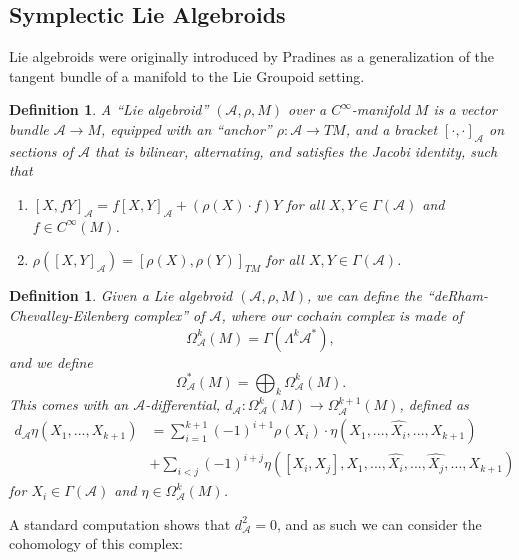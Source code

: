\documentclass{amsart}
\newcommand{\ra}{\rightarrow}
\newtheorem{definition}[theorem]{Definition}
\newcommand{\A}{\mathcal{A}}
\theoremstyle{definition}
\begin{document}
\subsection{Symplectic Lie Algebroids}
Lie algebroids were originally introduced by Pradines \cite{zbMATH03247872} as a generalization of the tangent bundle of a manifold to the Lie Groupoid setting.
\begin{definition}
     A ``Lie algebroid'' $(\A, \rho, M)$ over a $C^\infty$-manifold $M$ is a vector bundle $\A \ra M$, equipped with an ``anchor'' $\rho:\A \ra TM$, and a bracket $[\cdot,\cdot]_\A$ on sections of $\A$ that is bilinear, alternating, and satisfies the Jacobi identity, such that
    \begin{enumerate}
        \item $[X,fY]_\A=f[X,Y]_\A + (\rho(X) \cdot f) Y$ for all $X,Y \in \Gamma(\A)$ and $f \in C^\infty(M)$.
        \item $\rho([X,Y]_\A) = [\rho(X),\rho(Y)]_{TM}$ for all $X,Y \in \Gamma(\A)$.
    \end{enumerate}
\end{definition}
\begin{definition}\label{DCEcomplex} Given a Lie algebroid $(\A, \rho,M)$, we can define the ``deRham-Chevalley-Eilenberg complex'' of $\A$, where our cochain complex is made of
\begin{equation*}
    \Omega^k_\A(M) = \Gamma(\Lambda^k\A^*),
\end{equation*}
and we define 
\begin{equation*}
    \Omega^*_\A(M) = \bigoplus_k \Omega^k_\A(M).
\end{equation*}
This comes with an $\A$-differential, $d_\A:\Omega^k_\A(M) \ra \Omega^{k+1}_\A(M)$, defined as
\begin{align*}
    d_\A \eta(X_1,...,X_{k+1}) &= \sum_{i=1}^{k+1} (-1)^{i+1}\rho(X_i)\cdot \eta (X_1,...,\widehat{X_i},...,X_{k+1}) \\
    &+ \sum_{i<j} (-1)^{i+j}\eta([X_i,X_j], X_1,...,\widehat{X_i},...,\widehat{X_j},...,X_{k+1})
\end{align*}
for $X_i \in \Gamma(\A)$ and $\eta \in \Omega^k_\A(M)$. 
\end{definition}
A standard computation shows that $d_\A^2=0$, and as such we can consider the cohomology of this complex:
\end{document}
